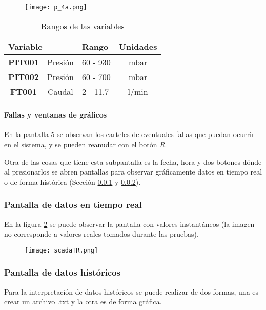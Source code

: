 \begin{figure}[h!]
	\centering
	\texttt{[image: p\_4a.png]}
	\label{fig:LC}
\end{figure}
\begin{table}[]
	\centering
	
	\begin{tabular}{|cc|l|c|}
		\hline
		\multicolumn{2}{|l|}{\textbf{Variable}} & \textbf{Rango} & \multicolumn{1}{l|}{\textbf{Unidades}} \\ \hline
		\multicolumn{1}{|c|}{\textbf{PIT001}} & Presión & 60 - 930 & mbar \\ \hline
		\multicolumn{1}{|c|}{\textbf{PIT002}} & Presión & 60 - 700 & mbar \\ \hline
		\multicolumn{1}{|c|}{\textbf{FT001}} & Caudal & 2 - 11,7 & l/min \\ \hline
	\end{tabular}
\caption{Rangos de las variables}
\label{tab:rang}
\end{table}

\paragraph{Fallas y ventanas de gráficos}
En la pantalla 5 se observan los carteles de eventuales fallas que puedan ocurrir en el sistema, y se pueden reanudar con el botón \textit{R}.

Otra de las cosas que tiene esta subpantalla es la fecha, hora y dos botones dónde al presionarlos se abren pantallas para observar gráficamente datos en tiempo real o de forma histórica (Sección \ref{sec:graf} y \ref{sec:graf2}).

\subsubsection{Pantalla de datos en tiempo real} \label{sec:graf}
En la figura \ref{fig:scadaTR} se puede observar la pantalla con valores instantáneos (la imagen no corresponde a valores reales tomados durante las pruebas).
\begin{figure}[h!]
	\centering
	\texttt{[image: scadaTR.png]}
	\label{fig:scadaTR}
\end{figure}

\subsubsection{Pantalla de datos históricos} \label{sec:graf2}
Para la interpretación de datos históricos se puede realizar de dos formas, una es crear un archivo .txt y la otra es de forma gráfica. 

